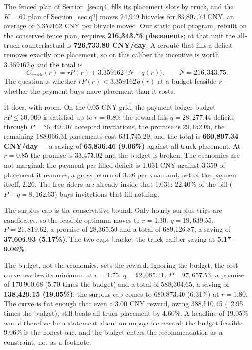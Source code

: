 The fenced plan of Section~\ref{sec:q4} fills its placement slots by truck, and the
$K=60$ plan of Section~\ref{sec:q2} moves 24,949 bicycles for 83,807.74 CNY, an average
of 3.359162 CNY per bicycle moved. Our static pool program, rebuilt on
the conserved fence plan, requires \textbf{216,343.75 placements}; at that unit the
all-truck counterfactual is \textbf{726,733.80 CNY/day}. A reroute that fills a deficit
removes exactly one placement, so on this caliber the incentive is worth
$3.359162\,q$ and the total is
\begin{equation}
C_{\text{truck}}(r)=rP(r)+3.359162\,\bigl(N-q(r)\bigr),\qquad N=216{,}343.75 .
\label{eq:q3truckcal}
\end{equation}
The question is whether $rP(r)<3.359162\,q(r)$ at a budget-feasible $r$ --- whether the
payment buys more placement than it costs.

It does, with room. On the 0.05-CNY grid, the payment-ledger budget $rP\le30{,}000$ is
satisfied up to $r=0.80$: the reward fills
$q=28{,}277.44$ deficits through $P=36{,}440.07$ accepted invitations, the promise is
29,152.05, the remaining 188,066.31 placements cost 631,745.29, and the total is
\textbf{660,897.34 CNY/day} --- a saving of \textbf{65,836.46 (9.06\%)} against
all-truck placement. At $r=0.85$ the promise is 33,473.02 and the budget is broken. The
economics are not marginal: the payment per filled deficit is 1.031 CNY against 3.359
of placement it removes, a gross return of 3.26 per yuan and, net of the payment
itself, 2.26. The free riders are already inside that 1.031: 22.40\% of the bill
($P-q=8{,}162.63$) buys invitations that fill nothing.

The surplus cap is the conservative bound. Only hourly surplus trips are candidates, so
the feasible optimum moves to $r=1.30$: $q=19{,}639.55$, $P=21{,}819.62$, a promise of
28,365.50 and a total of 689,126.87, a saving of \textbf{37,606.93 (5.17\%)}. The two
caps bracket the truck-caliber saving at \textbf{5.17--9.06\%}.

The budget, not the economics, sets the reward. Ignoring the budget, the cost curve
reaches its minimum at $r=1.75$: $q=92{,}085.41$, $P=97{,}657.53$, a promise of
170,900.68 (5.70 times the budget) and a total of 588,304.65, a saving of
\textbf{138,429.15 (19.05\%)}; the surplus cap comes to 680,873.40 (6.31\%) at
$r=1.80$. The curve is flat enough that even a 3.00 CNY reward, owing 388,510.45
(12.95 times the budget), still beats all-truck placement by 4.60\%. A headline of
19.05\% would therefore be a statement about an unpayable reward; the budget-feasible
9.06\% is the honest one, and the budget enters the recommendation as a constraint, not
as a footnote.

